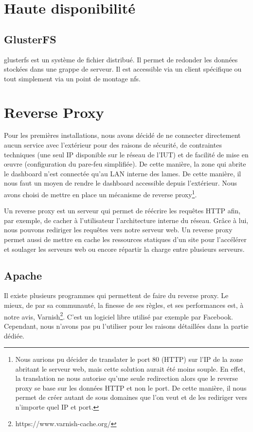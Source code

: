 \documentclass[a4paper,oneside]{report}
\begin{document}
\section{Haute disponibilité}
\subsection{GlusterFS} \label{sec:glusterfs}
\gls{glusterfs} est un système de fichier distribué. Il permet de redonder les données stockées dans une grappe de serveur. Il est accessible via un client spécifique ou tout simplement via un point de montage \gls{nfs}.

\section{Reverse Proxy}
Pour les premières installations, nous avons décidé de ne connecter directement aucun service avec l'extérieur pour des raisons de sécurité, de contraintes techniques (une seul IP disponible sur le réseau de l'IUT) et de facilité de mise en œuvre (configuration du pare-feu simplifiée).
De cette manière, la zone qui abrite le dashboard n'est connectée qu'au LAN interne des lames.
De cette manière, il nous faut un moyen de rendre le dashboard accessible depuis l'extérieur. 
Nous avons choisi de mettre en place un mécanisme de reverse proxy\footnote{Nous aurions pu décider de translater le port 80 (HTTP) sur l'IP de la zone abritant le serveur web, mais cette solution aurait été moins souple.
En effet, la translation ne nous autorise qu'une seule redirection alors que le reverse proxy se base sur les données HTTP et non le port. De cette manière, il nous permet de créer autant de sous domaines que l'on veut et de les rediriger vers n'importe quel IP et port.}.

Un reverse proxy est un serveur qui permet de réécrire les requêtes HTTP afin, par exemple, de cacher à l'utilisateur l'architecture interne du réseau.\newline
Grâce à lui, nous pouvons rediriger les requêtes vers notre serveur web.
Un reverse proxy permet aussi de mettre en cache les ressources statiques d'un site pour l'accélérer et soulager les serveurs web ou encore répartir la charge entre plusieurs serveurs.

\subsection{Apache}
Il existe plusieurs programmes qui permettent de faire du reverse proxy.
Le mieux, de par sa communauté, la finesse de ses règles, et ses performances est, à notre avis, Varnish\footnote{https://www.varnish-cache.org/}.
C'est un logiciel libre utilisé par exemple par Facebook. Cependant, nous n'avons pas pu l'utiliser pour les raisons détaillées dans la partie dédiée.
\end{document}
